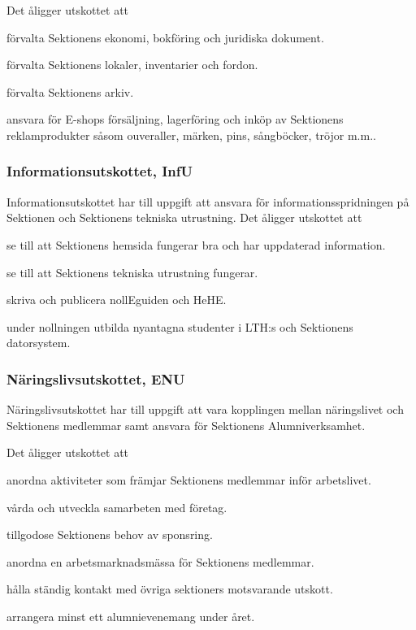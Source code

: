 \documentclass[10pt]{article}
\begin{document}
Det åligger utskottet att
\begin{tightdashlist}
\item förvalta Sektionens ekonomi, bokföring och juridiska dokument.
\item förvalta Sektionens lokaler, inventarier och fordon.
\item förvalta Sektionens arkiv.
\item ansvara för E-shops försäljning, lagerföring och inköp av Sektionens reklamprodukter såsom ouveraller, märken, pins, sångböcker, tröjor m.m..
\end{tightdashlist}

\subsubsection{Informationsutskottet, InfU}
Informationsutskottet har till uppgift att ansvara för informationsspridningen på Sektionen och Sektionens tekniska utrustning.
Det åligger utskottet att
\begin{tightdashlist}
    \item se till att Sektionens hemsida fungerar bra och har uppdaterad information.
    \item se till att Sektionens tekniska utrustning fungerar.
    \item skriva och publicera nollEguiden och HeHE.
    \item under nollningen utbilda nyantagna studenter i LTH:s och Sektionens datorsystem.
\end{tightdashlist}

\subsubsection{Näringslivsutskottet, ENU}
Näringslivsutskottet har till uppgift att vara kopplingen mellan näringslivet och Sektionens medlemmar samt ansvara för Sektionens Alumniverksamhet.

Det åligger utskottet att
\begin{tightdashlist}
\item anordna aktiviteter som främjar Sektionens medlemmar inför arbetslivet.
\item vårda och utveckla samarbeten med företag.
\item tillgodose Sektionens behov av sponsring.
\item anordna en arbetsmarknadsmässa för Sektionens medlemmar.
\item hålla ständig kontakt med övriga sektioners motsvarande utskott.
\item arrangera minst ett alumnievenemang under året.
\end{tightdashlist}
\end{document}
